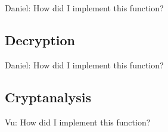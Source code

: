 Daniel:
How did I implement this function?


\subsection{Decryption}

Daniel:
How did I implement this function?


\subsection{Cryptanalysis}

Vu:
How did I implement this function?
